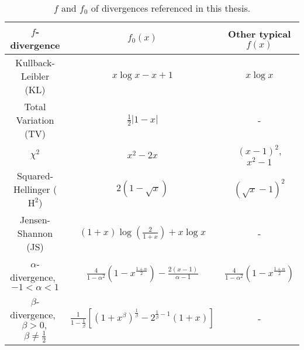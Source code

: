 %








{
\renewcommand{\arraystretch}{2}
\begin{table}
 \caption[$f$-divergences]{$f$ and $f_0$ of divergences referenced in this thesis.}
 \label{table:f-fns}
 \centering
 \begin{tabular}{c c c} 
 \toprule
 $f$-divergence & $f_0(x)$ & Other typical $f(x)$ \\
 \midrule
 Kullback-Leibler (KL) & $x \log x - x + 1$ & $x \log x$\\
 Total Variation (TV) & $\frac{1}{2}|1-x|$& - \\
 $\chi^2$ & $x^2 - 2x$& $(x-1)^2$,\: $x^2 -1$\\
 Squared-Hellinger ($\text{H}^2$) & $2(1-\sqrt{x})$&  $(\sqrt{x} - 1)^2$\\
 Jensen-Shannon (JS) & $(1+x)\log(\frac{2}{1+x}) + x\log x$& -\\
 $\alpha$-divergence, \,
 $-1<\alpha < 1$ & $\frac{4}{1-\alpha^2}\left( 1 - x^{\frac{1+\alpha}{2}} \right) - \frac{2(x-1)}{\alpha-1}$ & $\frac{4}{1-\alpha^2}\left( 1 - x^{\frac{1+\alpha}{2}} \right)$\\
 $\beta$-divergence, \,
 $\beta > 0,$ $\beta\not=\frac{1}{2}$ & $\frac{1}{1-\frac{1}{\beta}}\left[ (1+x^\beta)^{\frac{1}{\beta}} - 2^{\frac{1}{\beta}-1}(1+x) \right]$& -\\
 \bottomrule
\end{tabular}
\end{table}
}


